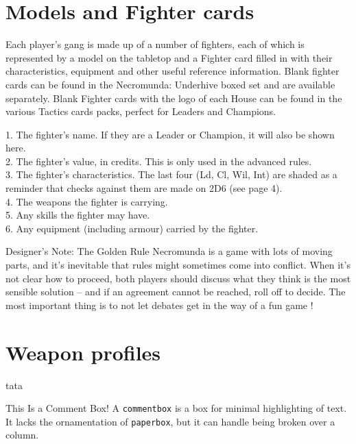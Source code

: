 \section{Models and Fighter cards}
Each player’s gang is made up of a number of fighters, each of which is represented by a model on the tabletop and a
Fighter card filled in with their characteristics, equipment and other useful reference information. Blank fighter
cards can be found in the Necromunda: Underhive boxed set and are available separately. Blank Fighter cards with the
logo of each House can be found in the various Tactics cards packs, perfect for Leaders and Champions.



\begin{dndtable}
  1. The fighter’s name. If they are a Leader or Champion, it will also be shown here. \\
  2. The fighter’s value, in credits. This is only used in the advanced rules. \\
  3. The fighter’s characteristics. The last four (Ld, Cl, Wil, Int) are shaded as a reminder that checks against them are
  made on 2D6 (see page 4). \\
  4. The weapons the fighter is carrying. \\
  5. Any skills the fighter may have. \\
  6. Any equipment (including armour) carried by the fighter.\\
\end{dndtable}


\begin{paperbox}{Designer’s Note: The Golden Rule}
  Necromunda is a game with lots of moving parts, and it’s inevitable that rules might sometimes come into conflict.
  When it’s not clear how to proceed, both players should discuss what they think is the most sensible solution – and if an agreement cannot be reached, roll off to decide.
  The most important thing is to not let debates get in the way of a fun game !
\end{paperbox}




\section{Weapon profiles}
tata

\begin{commentbox}{This Is a Comment Box!}
  A \lstinline!commentbox! is a box for minimal highlighting of text. It lacks the ornamentation of \lstinline!paperbox!, but it can handle being broken over a column.
\end{commentbox}


